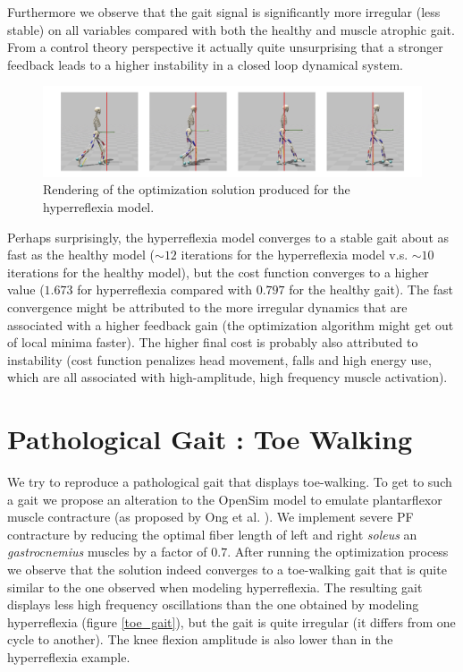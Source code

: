 \documentclass[11pt]{article}
\begin{document}
Furthermore we observe that the gait signal is significantly more irregular (less stable) on all variables compared with both the healthy and muscle atrophic gait. From a control theory perspective it actually quite unsurprising that a stronger feedback leads to a higher instability in a closed loop dynamical system.

\begin{figure}[h!]
    \centering
    \includegraphics[width=\textwidth]{screens/toe_walk_hr.jpg}
    \caption{Rendering of the optimization solution produced for the hyperreflexia model.}
    \label{hr_render}
\end{figure}

Perhaps surprisingly, the hyperreflexia model converges to a stable gait about as fast as the healthy model ($\sim 12$ iterations for the hyperreflexia model v.s. $\sim 10$ iterations for the healthy model), but the cost function converges to a higher value ($1.673$ for hyperreflexia compared with $0.797$ for the healthy gait). The fast convergence might be attributed to the more irregular dynamics that are associated with a higher feedback gain (the optimization algorithm might get out of local minima faster). The higher final cost is probably also attributed to instability (cost function penalizes head movement, falls and high energy use, which are all associated with high-amplitude, high frequency muscle activation).

\section{Pathological Gait : Toe Walking}

We try to reproduce a pathological gait that displays toe-walking. To get to such a gait we propose an alteration to the OpenSim model to emulate plantarflexor muscle contracture (as proposed by Ong et al. \cite{1}). We implement severe PF contracture by reducing the optimal fiber length of left and right \textit{soleus} an \textit{gastrocnemius} muscles by a factor of $0.7$. After running the optimization process we observe that the solution indeed converges to a toe-walking gait that is quite similar to the one observed when modeling hyperreflexia. The resulting gait displays less high frequency oscillations than the one obtained by modeling hyperreflexia (figure \ref{toe_gait}), but the gait is quite irregular (it differs from one cycle to another). The knee flexion amplitude is also lower than in the hyperreflexia example.
\end{document}
